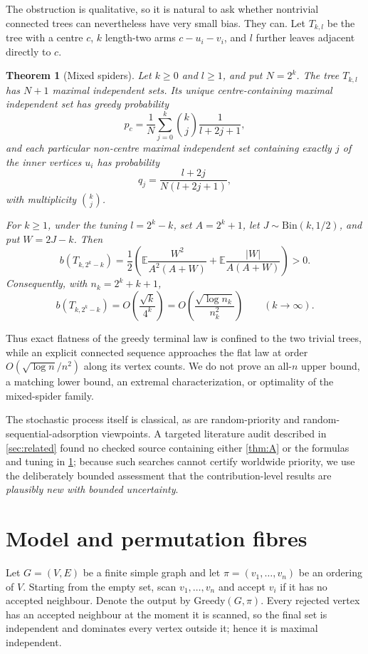 \documentclass[11pt]{article}
\newtheorem{theorem}{Theorem}[section]
\theoremstyle{definition}
\newcommand{\E}{\mathbb{E}}
\begin{document}
The obstruction is qualitative, so it is natural to ask whether nontrivial connected trees can nevertheless have very small bias.  They can.  Let $T_{k,l}$ be the tree with a centre $c$, $k$ length-two arms $c-u_i-v_i$, and $l$ further leaves adjacent directly to $c$.

\begin{theorem}[Mixed spiders]\label{thm:B}
Let $k\ge0$ and $l\ge1$, and put $N=2^k$.  The tree $T_{k,l}$ has $N+1$ maximal independent sets.  Its unique centre-containing maximal independent set has greedy probability
\[
 p_c=\frac1N\sum_{j=0}^k\binom{k}{j}\frac1{l+2j+1},
\]
and each particular non-centre maximal independent set containing exactly $j$ of the inner vertices $u_i$ has probability
\[
 q_j=\frac{l+2j}{N(l+2j+1)},
\]
with multiplicity $\binom{k}{j}$.

For $k\ge1$, under the tuning $l=2^k-k$, set $A=2^k+1$, let $J\sim\mathrm{Bin}(k,1/2)$, and put $W=2J-k$.  Then
\[
 b(T_{k,2^k-k})
 =\frac12\left(
 \E\frac{W^2}{A^2(A+W)}
 +\E\frac{|W|}{A(A+W)}
 \right)>0.
\]
Consequently, with $n_k=2^k+k+1$,
\[
 b(T_{k,2^k-k})
 =O\!\left(\frac{\sqrt{k}}{4^k}\right)
 =O\!\left(\frac{\sqrt{\log n_k}}{n_k^2}\right)
 \qquad (k\to\infty).
\]
\end{theorem}

Thus exact flatness of the greedy terminal law is confined to the two trivial trees, while an explicit connected sequence approaches the flat law at order $O(\sqrt{\log n}/n^2)$ along its vertex counts.  We do not prove an all-$n$ upper bound, a matching lower bound, an extremal characterization, or optimality of the mixed-spider family.

The stochastic process itself is classical, as are random-priority and random-sequential-adsorption viewpoints.  A targeted literature audit described in \cref{sec:related} found no checked source containing either \cref{thm:A} or the formulas and tuning in \cref{thm:B}; because such searches cannot certify worldwide priority, we use the deliberately bounded assessment that the contribution-level results are \emph{plausibly new with bounded uncertainty}.

\section{Model and permutation fibres}\label{sec:model}

Let $G=(V,E)$ be a finite simple graph and let $\pi=(v_1,\dots,v_n)$ be an ordering of $V$.  Starting from the empty set, scan $v_1,\dots,v_n$ and accept $v_i$ if it has no accepted neighbour.  Denote the output by $\mathrm{Greedy}(G,\pi)$.  Every rejected vertex has an accepted neighbour at the moment it is scanned, so the final set is independent and dominates every vertex outside it; hence it is maximal independent.
\end{document}
